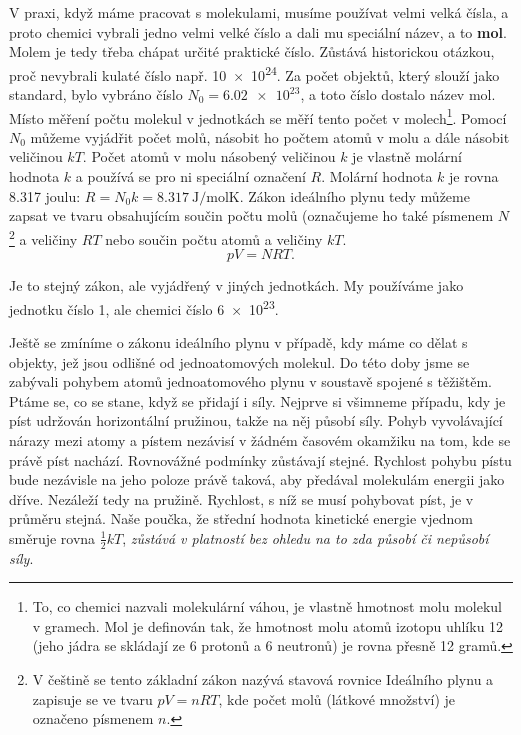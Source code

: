     V praxi, když máme pracovat s molekulami, musíme používat velmi velká čísla, a proto chemici
    vybrali jedno velmi velké číslo a dali mu speciální název, a to \textbf{mol}. Molem je tedy
    třeba chápat určité praktické číslo. Zůstává historickou otázkou, proč nevybrali kulaté číslo
    např. \num{10e24}. Za počet objektů, který slouží jako standard, bylo vybráno číslo \(N_0 =
    \num{6.02e23}\), a toto číslo dostalo název mol. Místo měření počtu molekul v jednotkách se měří
    tento počet v molech\footnote{To, co chemici nazvali molekulární váhou, je vlastně hmotnost molu
    molekul v gramech. Mol je definován tak, že hmotnost molu atomů izotopu uhlíku 12 (jeho jádra se
    skládají ze 6 protonů a 6 neutronů) je rovna přesně \num{12} gramů.}.  Pomocí \(N_0\) můžeme
    vyjádřit počet molů, násobit ho počtem atomů v molu a dále násobit veličinou \(kT\). Počet atomů
    v molu násobený veličinou \(k\) je vlastně molární hodnota \(k\) a používá se pro ni speciální
    označení \(R\). Molární hodnota \(k\) je rovna \num{8.317} joulu: \(R = N_0k =
    \qty{8.317}{\joule\per\mol\kelvin}\). Zákon ideálního plynu tedy můžeme zapsat ve tvaru
    obsahujícím součin počtu molů (označujeme ho také písmenem \(N\)\footnote{ V češtině se tento
    základní zákon nazývá stavová rovnice Ideálního plynu a zapisuje se ve tvaru \(pV=nRT\), kde
    počet molů (látkové množství) je označeno písmenem \(n\).} a veličiny \(RT\) nebo součin počtu
    atomů a veličiny \(kT\).
    \begin{equation}\label{fyz:eq633}
      \boxed{pV=NRT}.
    \end{equation}

    Je to stejný zákon, ale vyjádřený v jiných jednotkách. My používáme jako jednotku číslo \num{1},
    ale chemici číslo \num{6e23}.

    Ještě se zmíníme o zákonu ideálního plynu v případě, kdy máme co dělat s objekty, jež jsou
    odlišné od jednoatomových molekul. Do této doby jsme se zabývali pohybem atomů jednoatomového
    plynu v soustavě spojené s těžištěm. Ptáme se, co se stane, když se přidají i síly. Nejprve si
    všimneme případu, kdy je píst udržován horizontální pružinou, takže na něj působí síly. Pohyb
    vyvolávající nárazy mezi atomy a pístem nezávisí v žádném časovém okamžiku na tom, kde se právě
    píst nachází. Rovnovážné podmínky zůstávají stejné. Rychlost pohybu pístu bude nezávisle na jeho
    poloze právě taková, aby předával molekulám energii jako dříve. Nezáleží tedy na pružině.
    Rychlost, s níž se musí pohybovat píst, je v průměru stejná. Naše poučka, že střední hodnota
    kinetické energie vjednom směruje rovna \(\frac{1}{2}kT\), \emph{zůstává v platností bez ohledu na to
    zda působí či nepůsobí síly}.

